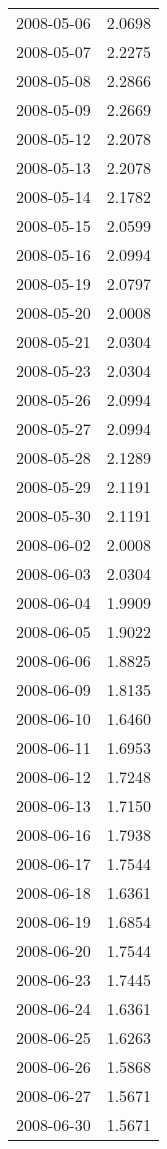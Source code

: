 \begin{tabular}{lr}
2008-05-06 &      2.0698 \\
2008-05-07 &      2.2275 \\
2008-05-08 &      2.2866 \\
2008-05-09 &      2.2669 \\
2008-05-12 &      2.2078 \\
2008-05-13 &      2.2078 \\
2008-05-14 &      2.1782 \\
2008-05-15 &      2.0599 \\
2008-05-16 &      2.0994 \\
2008-05-19 &      2.0797 \\
2008-05-20 &      2.0008 \\
2008-05-21 &      2.0304 \\
2008-05-23 &      2.0304 \\
2008-05-26 &      2.0994 \\
2008-05-27 &      2.0994 \\
2008-05-28 &      2.1289 \\
2008-05-29 &      2.1191 \\
2008-05-30 &      2.1191 \\
2008-06-02 &      2.0008 \\
2008-06-03 &      2.0304 \\
2008-06-04 &      1.9909 \\
2008-06-05 &      1.9022 \\
2008-06-06 &      1.8825 \\
2008-06-09 &      1.8135 \\
2008-06-10 &      1.6460 \\
2008-06-11 &      1.6953 \\
2008-06-12 &      1.7248 \\
2008-06-13 &      1.7150 \\
2008-06-16 &      1.7938 \\
2008-06-17 &      1.7544 \\
2008-06-18 &      1.6361 \\
2008-06-19 &      1.6854 \\
2008-06-20 &      1.7544 \\
2008-06-23 &      1.7445 \\
2008-06-24 &      1.6361 \\
2008-06-25 &      1.6263 \\
2008-06-26 &      1.5868 \\
2008-06-27 &      1.5671 \\
2008-06-30 &      1.5671 \\

\end{tabular}
